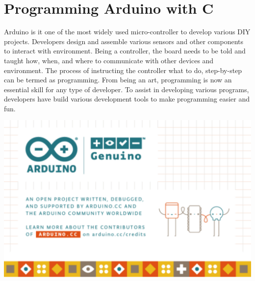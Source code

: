 \chapter{Programming Arduino with C}
\par Arduino is it one of the most widely used micro-controller to develop various DIY projects. Developers design and assemble various sensors and other components to interact with environment. Being a controller, the board needs to be told and taught how, when, and where to communicate with other devices and environment. The process of instructing the controller what to do, step-by-step can be termed as programming. From being an art, programming is now an essential skill for any type of developer. To assist in developing various programs, developers have build various development tools to make programming easier and fun. 
\begin{marginfigure}
	\raggedright
    \vspace{-4cm}  \includegraphics{Images/Programing_Arduino/IDE_startup.png}
\end{marginfigure}

